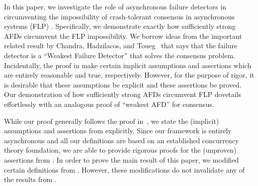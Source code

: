\documentclass[11pt]{article}
\numberwithin{theorem}{section}
\begin{document}
In this paper, we investigate the role of asynchronous failure detectors in circumventing the impossibility of crash-tolerant consensus in asynchronous systems (FLP) \cite{FLP}. Specifically, we demonstrate exactly how sufficiently strong AFDs circumvent
the FLP impossibility.  We borrow ideas from the important related result by Chandra, Hadzilacos,
and Toueg~\cite{chan:twfdf} that says that the failure detector  is a
``Weakest Failure Detector'' that solves the consensus
problem. Incidentally, the proof in \cite{chan:twfdf} make certain implicit assumptions
and assertions which are entirely reasonable and true, respectively. However, for
the purpose of rigor, it is desirable that these assumptions be explicit
and these assertions be proved. Our demonstration of how sufficiently strong AFDs circumvent FLP dovetails effortlessly with an analogous proof of  ``weakest AFD'' for consensus.


While our proof generally follows the proof in~\cite{chan:twfdf}, we
state the (implicit) assumptions and assertions from \cite{chan:twfdf} explicitly.
Since our framework is entirely asynchronous and all our definitions are based
on an established concurrency theory foundation, we are able to provide
rigorous proofs for the (unproven) assertions from \cite{chan:twfdf}. In order to prove the main result of this paper, we modified certain definitions from \cite{cornejoetalAFD-TR}. However, these modifications do not invalidate any of the results from \cite{cornejoetalAFD,cornejoetalAFD-TR}.
\end{document}
